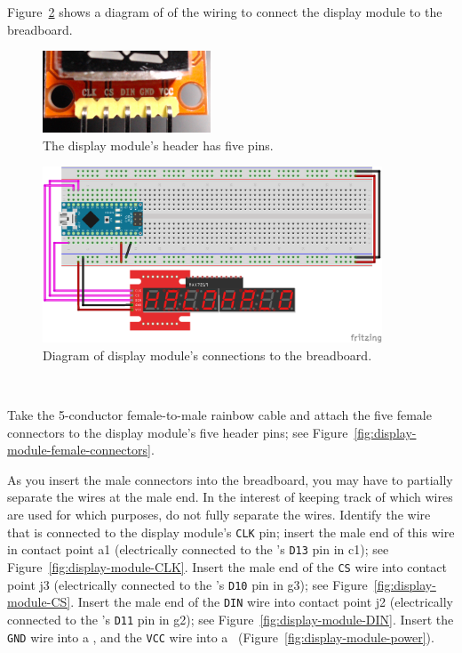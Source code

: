 Figure~\ref{fig:display-diagram} shows a diagram of of the wiring to connect
the display module to the breadboard.

\begin{figure}
    \centering
    \includegraphics[width=5cm]{display-module-header}
    \caption{The display module's header has five pins.
        \label{fig:display-module-header}}
\end{figure}

\begin{figure}
    \centering
    \includegraphics[width=0.9\textwidth]{fritzing_images/display}
    \caption{Diagram of display module's connections to the breadboard.
        \label{fig:display-diagram}}
\end{figure}

\disconnect\

Take the 5-conductor female-to-male rainbow cable and attach the five female
connectors to the display module's five header pins; see
Figure~\ref{fig:display-module-female-connectors}.

As you insert the male connectors into the breadboard, you may have to
partially separate the wires at the male end. In the interest of keeping track
of which wires are used for which purposes, do not fully separate the wires.
Identify the wire that is connected to the display module's \texttt{CLK} pin;
insert the male end of this wire in contact point a1 (electrically connected to
the \nano's \texttt{D13} pin in c1); see Figure~\ref{fig:display-module-CLK}.
Insert the male end of the \texttt{CS} wire into contact point j3 (electrically
connected to the \nano's \texttt{D10} pin in g3); see
Figure~\ref{fig:display-module-CS}. Insert the male end of the \texttt{DIN}
wire into contact point j2 (electrically connected to the \nano's \texttt{D11}
pin in g2); see Figure~\ref{fig:display-module-DIN}. Insert the \texttt{GND}
wire into a \ground, and the \texttt{VCC} wire into a \power\
(Figure~\ref{fig:display-module-power}).

